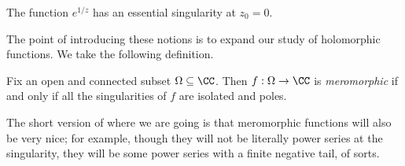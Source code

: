 \begin{example}
	The function $e^{1/z}$ has an essential singularity at $z_0=0$.
\end{example}
The point of introducing these notions is to expand our study of holomorphic functions. We take the following definition.
\begin{definition}[Meromorphic]
	Fix an open and connected subset $\Omega\subseteq\CC$. Then $f:\Omega\to\CC$ is \textit{meromorphic} if and only if all the singularities of $f$ are isolated and poles.
\end{definition}
The short version of where we are going is that meromorphic functions will also be very nice; for example, though they will not be literally power series at the singularity, they will be some power series with a finite negative tail, of sorts.

